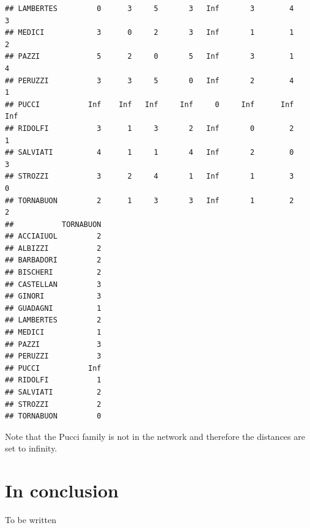 \documentclass[]{article}
\begin{document}
\begin{verbatim}
## LAMBERTES         0      3     5       3   Inf       3        4       3
## MEDICI            3      0     2       3   Inf       1        1       2
## PAZZI             5      2     0       5   Inf       3        1       4
## PERUZZI           3      3     5       0   Inf       2        4       1
## PUCCI           Inf    Inf   Inf     Inf     0     Inf      Inf     Inf
## RIDOLFI           3      1     3       2   Inf       0        2       1
## SALVIATI          4      1     1       4   Inf       2        0       3
## STROZZI           3      2     4       1   Inf       1        3       0
## TORNABUON         2      1     3       3   Inf       1        2       2
##           TORNABUON
## ACCIAIUOL         2
## ALBIZZI           2
## BARBADORI         2
## BISCHERI          2
## CASTELLAN         3
## GINORI            3
## GUADAGNI          1
## LAMBERTES         2
## MEDICI            1
## PAZZI             3
## PERUZZI           3
## PUCCI           Inf
## RIDOLFI           1
## SALVIATI          2
## STROZZI           2
## TORNABUON         0
\end{verbatim}

Note that the Pucci family is not in the network and therefore the
distances are set to infinity.

\section{In conclusion}\label{in-conclusion}

To be written
\end{document}

